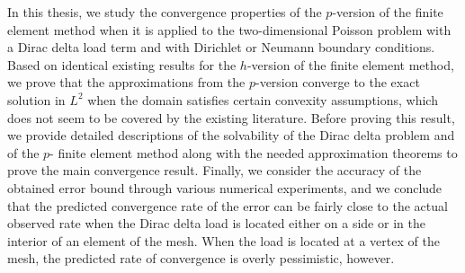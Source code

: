\documentclass[english, 12pt, a4paper, sci, utf8, a-2b, online]{aaltothesis}
\date{29 April 2024}
\theoremstyle{definition}
\theoremstyle{plain}
\numberwithin{equation}{section}
\begin{document}
\makecoverpage

\makecopyrightpage

\clearpage

\begin{abstractpage}[english]
In this thesis, we study the convergence properties of the $p$-version of
the finite element method when it is applied to the two-dimensional Poisson problem
with a Dirac delta load term and with Dirichlet or Neumann boundary conditions.
Based on identical existing results for the $h$-version of the finite element method,
we prove that the approximations from the $p$-version converge to the exact solution in $L^2$
when the domain satisfies certain convexity assumptions,
which does not seem to be covered by the existing literature.
Before proving this result, we provide detailed descriptions of the solvability
of the Dirac delta problem and of the $p$- finite element method along with the needed
approximation theorems to prove the main convergence result.
Finally, we consider the accuracy of the obtained error bound through various
numerical experiments, and we conclude that the predicted convergence rate of the error
can be fairly close to the actual observed rate
when the Dirac delta load is located either on a side or in the interior of an element
of the mesh. When the load is located at a vertex of the mesh,
the predicted rate of convergence is overly pessimistic, however.
\end{abstractpage}

\end{document}
